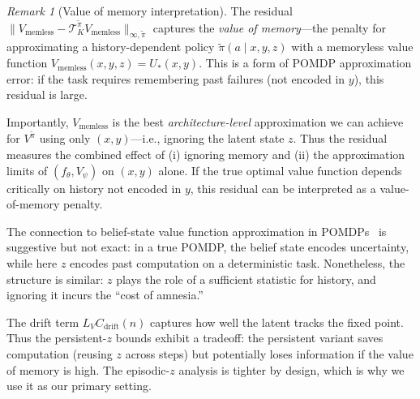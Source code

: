 \documentclass{article}
\theoremstyle{plain}
\theoremstyle{definition}
\theoremstyle{remark}
\newtheorem{remark}[theorem]{Remark}
\newcommand{\Cdrift}{C_{\mathrm{drift}}}
\begin{document}
{\begin{remark}[Value of memory interpretation]
\label{rem:value_of_memory}
The residual $\|V_{\mathrm{memless}} - \mathcal{T}_K^{\tilde{\pi}} V_{\mathrm{memless}}\|_{\infty,\tilde{\pi}}$ captures the \emph{value of memory}---the penalty for approximating a history-dependent policy $\tilde{\pi}(a\mid x,y,z)$ with a memoryless value function $V_{\mathrm{memless}}(x,y,z) = U_*(x,y)$.
This is a form of POMDP approximation error: if the task requires remembering past failures (not encoded in $y$), this residual is large.

Importantly, $V_{\mathrm{memless}}$ is the best \emph{architecture-level} approximation we can achieve for $V^{\tilde{\pi}}$ using only $(x,y)$---i.e., ignoring the latent state $z$.
Thus the residual measures the combined effect of (i) ignoring memory and (ii) the approximation limits of $(f_\theta, V_\psi)$ on $(x,y)$ alone.
If the true optimal value function depends critically on history not encoded in $y$, this residual can be interpreted as a value-of-memory penalty.

The connection to belief-state value function approximation in POMDPs~\citep{Kaelbling1998POMDP} is suggestive but not exact: in a true POMDP, the belief state encodes uncertainty, while here $z$ encodes past computation on a deterministic task.
Nonetheless, the structure is similar: $z$ plays the role of a sufficient statistic for history, and ignoring it incurs the ``cost of amnesia.''

The drift term $L_V \Cdrift(n)$ captures how well the latent tracks the fixed point.
Thus the persistent-$z$ bounds exhibit a tradeoff: the persistent variant saves computation (reusing $z$ across steps) but potentially loses information if the value of memory is high.
The episodic-$z$ analysis is tighter by design, which is why we use it as our primary setting.
\end{remark}}
\end{document}
